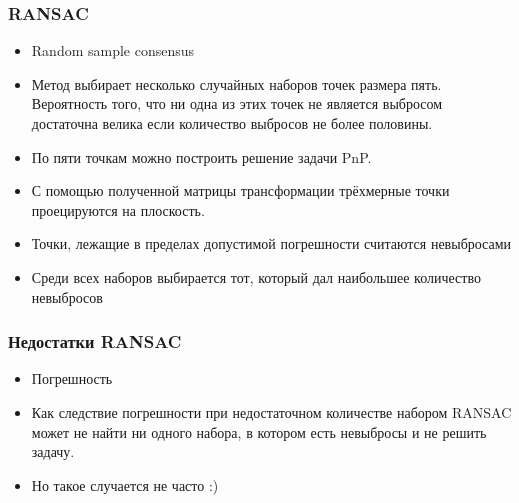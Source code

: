 \begin{frame}\frametitle{RANSAC}
    \begin{itemize}
        \item Random sample consensus
        \item Метод выбирает несколько случайных наборов точек размера пять. 
            Вероятность того, что ни одна из этих точек не является выбросом достаточна велика 
            если количество выбросов не более половины.
        \item По пяти точкам можно построить решение задачи PnP.
        \item С помощью полученной матрицы трансформации трёхмерные точки 
            проецируются на плоскость.
        \item Точки, лежащие в пределах допустимой погрешности считаются невыбросами
        \item Среди всех наборов выбирается тот, который дал наибольшее количество невыбросов
    \end{itemize}
\end{frame}
\begin{frame}\frametitle{Недостатки RANSAC}
    \begin{itemize}
        \item Погрешность
        \item Как следствие погрешности при недостаточном количестве набором RANSAC может 
            не найти ни одного набора, в котором есть невыбросы и не решить задачу.
        \item Но такое случается не часто :)
    \end{itemize}
\end{frame}



